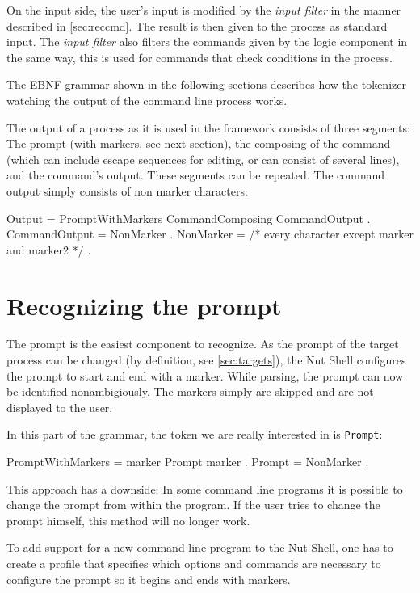 \documentclass[paper=a4,twoside,abstract=on,cleardoublepage=empty,numbers=noenddot,toc=bib,12pt,appendixprefix=true]{scrreprt}
\begin{document}
On the input side, the user's input is modified by the \emph{input filter} in the manner described in \cref{sec:reccmd}. The result is then given to the process as standard input. The \emph{input filter} also filters the commands given by the logic component in the same way, this is used for commands that check conditions in the process.

The EBNF grammar shown in the following sections describes how the tokenizer watching the output of the command line process works.

The output of a process as it is used in the framework consists of three segments: The prompt (with markers, see next section), the composing of the command (which can include escape sequences for editing, or can consist of several lines), and the command's output. These segments can be repeated. The command output simply consists of non marker characters:

\begin{ebnf}
Output = { PromptWithMarkers CommandComposing CommandOutput } .
CommandOutput = { NonMarker } .
NonMarker = /* every character except marker and marker2 */ .
\end{ebnf}

\section{Recognizing the prompt}

The prompt is the easiest component to recognize. As the prompt of the target process can be changed (by definition, see \cref{sec:targets}), the Nut Shell configures the prompt to start and end with a marker. While parsing, the prompt can now be identified nonambigiously. The markers simply are skipped and are not displayed to the user.

In this part of the grammar, the token we are really interested in is \texttt{Prompt}:

\begin{ebnf}
PromptWithMarkers = marker Prompt marker .
Prompt = { NonMarker } .
\end{ebnf}
%
This approach has a downside: In some command line programs it is possible to change the prompt from within the program. If the user tries to change the prompt himself, this method will no longer work.

To add support for a new command line program to the Nut Shell, one has to create a profile that specifies which options and commands are necessary to configure the prompt so it begins and ends with markers.
\end{document}
